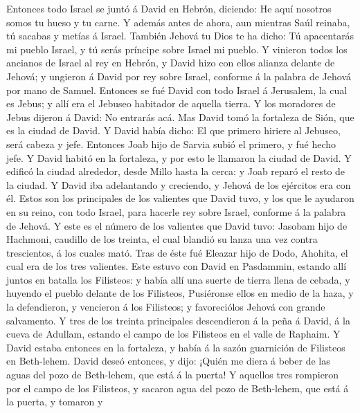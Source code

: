  Entonces todo Israel se juntó á David en Hebrón,
diciendo: He aquí nosotros somos tu hueso y tu carne.  Y
además antes de ahora, aun mientras Saúl reinaba, tú sacabas y metías á
Israel. También Jehová tu Dios te ha dicho: Tú apacentarás mi pueblo
Israel, y tú serás príncipe sobre Israel mi pueblo.  Y
vinieron todos los ancianos de Israel al rey en Hebrón, y David hizo con
ellos alianza delante de Jehová; y ungieron á David por rey sobre
Israel, conforme á la palabra de Jehová por mano de Samuel.
 Entonces se fué David con todo Israel á Jerusalem, la
cual es Jebus; y allí era el Jebuseo habitador de aquella tierra.
 Y los moradores de Jebus dijeron á David: No entrarás
acá. Mas David tomó la fortaleza de Sión, que es la ciudad de David.
 Y David había dicho: El que primero hiriere al Jebuseo,
será cabeza y jefe. Entonces Joab hijo de Sarvia subió el primero, y fué
hecho jefe.  Y David habitó en la fortaleza, y por esto le
llamaron la ciudad de David.  Y edificó la ciudad
alrededor, desde Millo hasta la cerca: y Joab reparó el resto de la
ciudad.  Y David iba adelantando y creciendo, y Jehová de
los ejércitos era con él.  Estos son los principales de
los valientes que David tuvo, y los que le ayudaron en su reino, con
todo Israel, para hacerle rey sobre Israel, conforme á la palabra de
Jehová.  Y este es el número de los valientes que David
tuvo: Jasobam hijo de Hachmoni, caudillo de los treinta, el cual blandió
su lanza una vez contra trescientos, á los cuales mató. 
Tras de éste fué Eleazar hijo de Dodo, Ahohita, el cual era de los tres
valientes.  Este estuvo con David en Pasdammin, estando
allí juntos en batalla los Filisteos: y había allí una suerte de tierra
llena de cebada, y huyendo el pueblo delante de los Filisteos,
 Pusiéronse ellos en medio de la haza, y la defendieron,
y vencieron á los Filisteos; y favoreciólos Jehová con grande
salvamento.  Y tres de los treinta principales
descendieron á la peña á David, á la cueva de Adullam, estando el campo
de los Filisteos en el valle de Raphaim.  Y David estaba
entonces en la fortaleza, y había á la sazón guarnición de Filisteos en
Beth-lehem.  David deseó entonces, y dijo: ¡Quién me
diera á beber de las aguas del pozo de Beth-lehem, que está á la puerta!
 Y aquellos tres rompieron por el campo de los Filisteos,
y sacaron agua del pozo de Beth-lehem, que está á la puerta, y tomaron y
